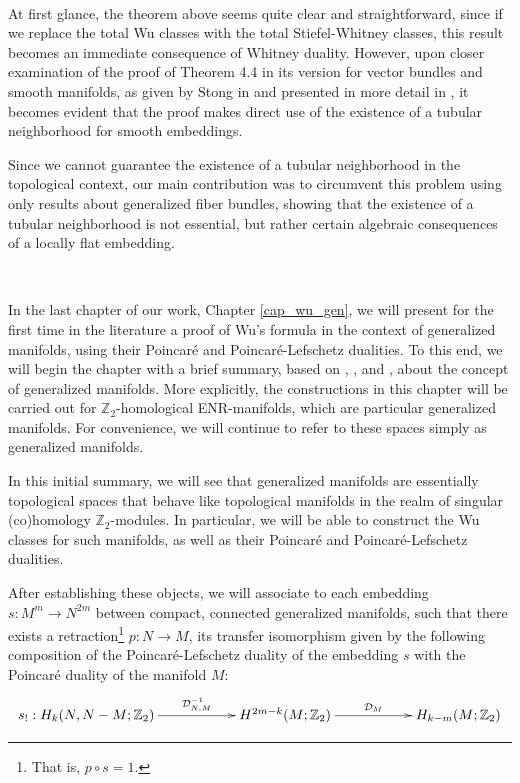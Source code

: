 \documentclass[12pt,oneside]{book}
\newcommand{\Z}{\mathbb{Z}}
\begin{document}
    \
    
    At first glance, the theorem above seems quite clear and straightforward, since if we replace the 
    total Wu classes with the total Stiefel-Whitney classes, this result becomes an immediate consequence 
    of Whitney duality. However, upon closer examination of the proof of Theorem 4.4 in its version for 
    vector bundles and smooth manifolds, as given by Stong in \cite{stong} and presented in more detail 
    in \cite{joao}, it becomes evident that the proof makes direct use of the existence of a tubular 
    neighborhood for smooth embeddings.

    Since we cannot guarantee the existence of a tubular neighborhood in the topological context, our 
    main contribution was to circumvent this problem using only results about generalized fiber bundles, 
    showing that the existence of a tubular neighborhood is not essential, but rather certain algebraic 
    consequences of a locally flat embedding.

    \
    
    In the last chapter of our work, Chapter \ref{cap_wu_gen}, we will present for the first time in the 
    literature a proof of Wu's formula in the context of generalized manifolds, using their Poincaré and 
    Poincaré-Lefschetz dualities. To this end, we will begin the chapter with a brief summary, based 
    on \cite{biasi}, \cite{denise}, and \cite{bredon_2}, about the concept of generalized manifolds. 
    More explicitly, the constructions in this chapter will be carried out for $\Z_{2}$-homological 
    ENR-manifolds, which are particular generalized manifolds. For convenience, we will continue to 
    refer to these spaces simply as generalized manifolds.

    In this initial summary, we will see that generalized manifolds are essentially topological spaces 
    that behave like topological manifolds in the realm of singular (co)homology $\Z_{2}$-modules. In 
    particular, we will be able to construct the Wu classes for such manifolds, as well as their Poincaré 
    and Poincaré-Lefschetz dualities.

    After establishing these objects, we will associate to each embedding $s:M^{m}\to N^{2m}$ between 
    compact, connected generalized manifolds, such that there exists a retraction\footnote{That is, 
    $p\circ s=1$.} $p:N\to M$, its transfer isomorphism given by the following composition of the 
    Poincaré-Lefschetz duality of the embedding $s$ with the Poincaré duality of the manifold $M$:
    $$ \xymatrix @C=0.5cm {
    s_{!}:H_{k}(N,N-M;\Z_{2}) \ar[rrr]^-{\mathcal{D}^{-1}_{N,M}} &&& H^{2m-k}(M;\Z_{2}) \ar[rrr]^-{\mathcal{D}_{M}} &&& H_{k-m}(M;\Z_{2})
    } $$
\end{document}
